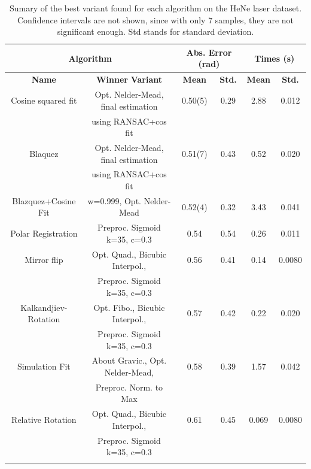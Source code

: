 \documentclass[11pt, a4paper, twoside]{article} %
\begin{document}
\begin{table}[h!]
\center
\caption{Sumary of the best variant found for each algorithm on the HeNe laser dataset. Confidence intervals are not shown, since with only 7 samples, they are not significant enough. Std stands for standard deviation. }\label{tab:resExp}
\hspace{-0.1cm}\begin{tabular}{c|c|cc|cc}
\toprule
 \multicolumn{2}{c|}{\bf Algorithm} &  \multicolumn{2}{|c|}{\bf \small Abs. Error (rad)} & \multicolumn{2}{|c}{\bf Times (s)} \\ \midrule \midrule
{\bf                     Name} &                          {\bf Winner} {\bf Variant} &  {\bf Mean} &  {\bf Std.} & {\bf Mean} & {\bf Std.}\\
\bottomrule\rule{0pt}{4mm}{}
    Cosine squared fit &  {\small  Opt. Nelder-Mead, final estimation } &  0.50(5) &  0.29 &  2.88 &  0.012 \\
                       &                   {\small using RANSAC+cos fit }&          &         &          &          \\ \hline\rule{0pt}{4mm}{}
               Blaquez &  {\small  Opt. Nelder-Mead, final estimation } &  0.51(7) & 0.43 &  0.52 &  0.020 \\
                       &                   {\small using RANSAC+cos fit }&          &         &          &          \\ \hline\rule{0pt}{4mm}{}
   Blazquez+Cosine Fit &              {\small w=0.999, Opt. Nelder-Mead} &  0.52(4) & 0.32 &  3.43 &  0.041 \\ \hline\rule{0pt}{4mm}{}
    Polar Registration &     {\small      Preproc. Sigmoid k=35, c=0.3} &  0.54 & 0.54 &  0.26 &  0.011 \\ \hline\rule{0pt}{4mm}{}
           Mirror flip &     {\small    Opt. Quad., Bicubic Interpol., }&  0.56 & 0.41 &  0.14 &  0.0080 \\
                       &        {\small   Preproc. Sigmoid k=35, c=0.3 }&          &         &          &          \\ \hline\rule{0pt}{4mm}{}
  Kalkandjiev-Rotation &      {\small  Opt. Fibo., Bicubic Interpol.,}  &  0.57 & 0.42 &  0.22 &  0.020 \\
                       &          {\small Preproc. Sigmoid k=35, c=0.3 } &          &         &          &          \\ \hline\rule{0pt}{4mm}{}
        Simulation Fit & {\small About Gravic., Opt. Nelder-Mead,}  &  0.58 & 0.39 &  1.57 &  0.042 \\
                       &                  {\small Preproc. Norm. to Max }&          &         &          &          \\ \hline\rule{0pt}{4mm}{}
     Relative Rotation &    {\small     Opt. Quad., Bicubic Interpol.}, &  0.61 & 0.45 &  0.069 &  0.0080 \\
                       &      {\small     Preproc. Sigmoid k=35, c=0.3 }&          &         &          &          \\ \hline\rule{0pt}{4mm}{}
                       

\end{tabular}
\end{table}
\end{document}
